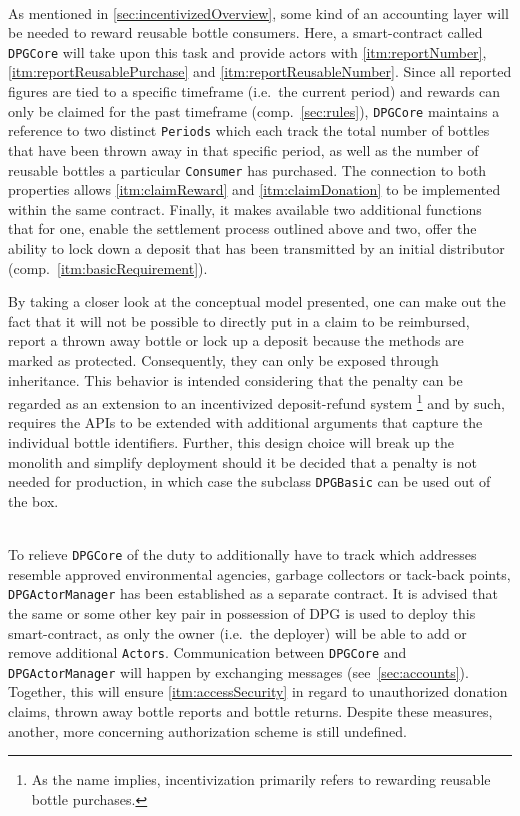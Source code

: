 \begin{description}[format={\storedescriptionlabel}]
	\item[Accounting\label{itm:accounting}]
	\hfill \\
	As mentioned in \autoref{sec:incentivizedOverview}, some kind of an accounting layer will be needed to reward reusable bottle consumers. Here, a smart-contract called \texttt{DPGCore} will take upon this task and provide actors with \ref{itm:reportNumber}, \ref{itm:reportReusablePurchase} and \ref{itm:reportReusableNumber}. Since all reported figures are tied to a specific timeframe (i.e.~the current period) and rewards can only be claimed for the past timeframe (comp.~\ref{sec:rules}), \texttt{DPGCore} maintains a reference to two distinct \texttt{Periods} which each track the total number of bottles that have been thrown away in that specific period, as well as the number of reusable bottles a particular \texttt{Consumer} has purchased. The connection to both properties allows \ref{itm:claimReward} and \ref{itm:claimDonation} to be implemented within the same contract. Finally, it makes available two additional functions that for one, enable the settlement process outlined above and two, offer the ability to lock down a deposit that has been transmitted by an initial distributor (comp.~\ref{itm:basicRequirement}). 
	
	By taking a closer look at the conceptual model presented, one can make out the fact that it will not be possible to directly put in a claim to be reimbursed, report a thrown away bottle or lock up a deposit because the methods are marked as protected. Consequently, they can only be exposed through inheritance. This behavior is intended considering that the penalty can be regarded as an extension to an incentivized deposit-refund system \footnote{As the name implies, incentivization primarily refers to rewarding reusable bottle purchases.} and by such, requires the APIs to be extended with additional arguments that capture the individual bottle identifiers. Further, this design choice will break up the monolith and simplify deployment should it be decided that a penalty is not needed for production, in which case the subclass \texttt{DPGBasic} can be used out of the box.
	\item[Access Control\label{itm:accessControl}]
	\hfill \\
	To relieve \texttt{DPGCore} of the duty to additionally have to track which addresses resemble approved environmental agencies, garbage collectors or tack-back points, \texttt{DPGActorManager} has been established as a separate contract. It is advised that the same or some other key pair in possession of \ac{DPG} is used to deploy this smart-contract, as only the owner (i.e.~the deployer) will be able to add or remove additional \texttt{Actors}. Communication between \texttt{DPGCore} and \texttt{DPGActorManager} will happen by exchanging messages (see~\ref{sec:accounts}). Together, this will ensure \ref{itm:accessSecurity} in regard to unauthorized donation claims, thrown away bottle reports and bottle returns. Despite these measures, another, more concerning authorization scheme is still undefined. 
	

\end{description}
